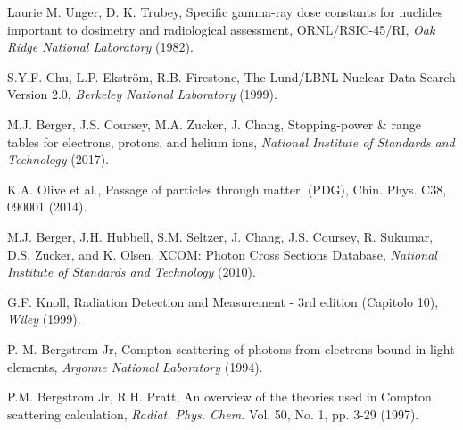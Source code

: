 \begin{thebibliography}{99} %

Laurie M. Unger, D. K. Trubey, Specific gamma-ray dose constants for nuclides important to dosimetry and radiological assessment, ORNL/RSIC-45/RI, \emph{Oak Ridge National Laboratory} (1982).

S.Y.F. Chu, L.P. Ekström, R.B. Firestone, The Lund/LBNL Nuclear Data Search Version 2.0, \emph{Berkeley National Laboratory} (1999).

M.J. Berger, J.S. Coursey, M.A. Zucker, J. Chang, Stopping-power \& range tables for electrons, protons, and helium ions, \emph{National Institute of Standards and Technology} (2017).

K.A. Olive et al., Passage of particles through matter, (PDG), Chin. Phys. C38, 090001 (2014).

M.J. Berger, J.H. Hubbell, S.M. Seltzer, J. Chang, J.S. Coursey, R. Sukumar, D.S. Zucker, and K. Olsen, XCOM: Photon Cross Sections Database, \emph{National Institute of Standards and Technology} (2010).

G.F. Knoll, Radiation Detection and Measurement - 3rd edition (Capitolo 10), \emph{Wiley} (1999).

P. M. Bergstrom Jr, Compton scattering of photons from electrons bound in light elements, \emph{Argonne National Laboratory} (1994).

P.M. Bergstrom Jr, R.H. Pratt, An overview of the theories used in Compton scattering calculation, \emph{Radiat. Phys. Chem.} Vol. 50, No. 1, pp. 3-29 (1997).

\end{thebibliography}
